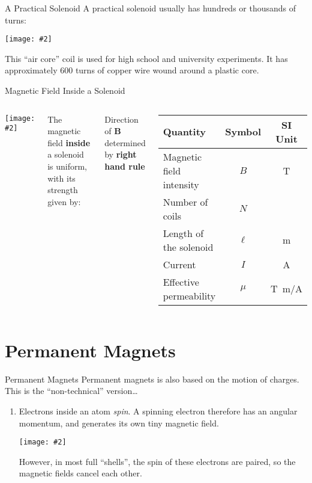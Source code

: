 \documentclass[12pt,aspectratio=169]{beamer}
\newcommand{\pic}[2]{\texttt{[image: \#2]}}
\newcommand{\eq}[2]{\vspace{#1}{\Large\begin{displaymath}#2\end{displaymath}}}
\begin{document}
\begin{frame}{A Practical Solenoid}
  A practical solenoid usually has hundreds or thousands of turns:
  \begin{center}
    \pic{.45}{1020201515330450255}
  \end{center}

  \vspace{-.2in}
  This ``air core'' coil is used for high school and university experiments. It
  has approximately 600 turns of copper wire wound around a plastic core.
\end{frame}



\begin{frame}{Magnetic Field Inside a Solenoid}
  \begin{columns}
    \pic{1}{magneticfield4}
    
    The magnetic field \textbf{inside} a solenoid is uniform, with its strength
    given by:
    
    \eq{-.2in}{
      \boxed{B=\frac{\mu NI}{\ell}}
    }
    
    Direction of $\bm{B}$ determined by \textbf{right hand rule}
    \begin{center}
      \begin{tabular}{l|c|c}
        \rowcolor{pink}
        \textbf{Quantity} & \textbf{Symbol} & \textbf{SI Unit} \\ \hline
        Magnetic field intensity & $B$    & \si{\tesla} \\
        Number of coils          & $N$    & \\
        Length of the solenoid   & $\ell$ & \si{\metre}\\
        Current                  & $I$    & \si{\ampere}\\
        Effective permeability   & $\mu$  & \si{T.m/A}
      \end{tabular}
    \end{center}
  \end{columns}
\end{frame}


\section{Permanent Magnets}

\begin{frame}{Permanent Magnets}
  Permanent magnets is also based on the motion of charges. This is the
  ``non-technical'' version\ldots

  \begin{enumerate}
  \item Electrons inside an atom \emph{spin}. A spinning electron therefore has
    an angular momentum, and generates its own tiny magnetic field.
    \begin{center}
      \pic{.3}{Electron-spin}
    \end{center}
    However, in most full ``shells'', the spin of these electrons are paired,
    so the magnetic fields cancel each other.
  \end{enumerate}
\end{frame}
\end{document}
